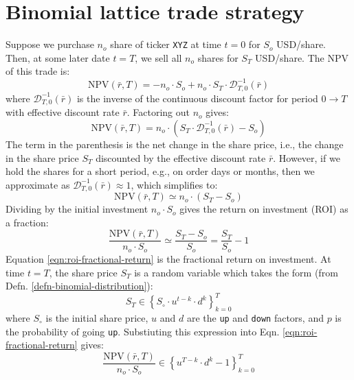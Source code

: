 \documentclass[11pt]{article}
\makeatletter
\theoremstyle{definition}
\renewcommand\subsubsection{\@startsection
	{subsubsection}{2}{0mm}
	{-0.05in}
	{-0.5\baselineskip}
	{\normalfont\normalsize\itshape\bfseries}}
\makeatother
\begin{document}

\section*{Binomial lattice trade strategy}
Suppose we purchase $n_{o}$ share of ticker \texttt{XYZ} at time $t=0$ for $S_{o}$ USD/share.
Then, at some later date $t=T$, we sell all $n_{o}$ shares for $S_{T}$ USD/share. 
The NPV of this trade is:
\begin{equation*}
\text{NPV}(\bar{r},T) = -n_{o}\cdot{S_{o}} + n_{o}\cdot{S_{T}}\cdot\mathcal{D}_{T,0}^{-1}(\bar{r})
\end{equation*}
where $\mathcal{D}_{T,0}^{-1}(\bar{r})$ is the inverse of the continuous discount factor 
for period $0\rightarrow{T}$ with effective discount rate $\bar{r}$. 
Factoring out $n_{o}$ gives:
\begin{equation*}
\text{NPV}(\bar{r},T) = n_{o}\cdot\left(S_{T}\cdot\mathcal{D}_{T,0}^{-1}(\bar{r}) - S_{o}\right)
\end{equation*}
The term in the parenthesis is the net change in the share price, i.e., the change in the share price $S_{T}$ discounted by the effective discount rate $\bar{r}$.
However, if we hold the shares for a short period, e.g., on order days or months, then we approximate as $\mathcal{D}_{T,0}^{-1}(\bar{r})\approx{1}$, which
simplifies to:
\begin{equation*}
\text{NPV}(\bar{r}, T) \simeq n_{o}\cdot(S_{T}-S_{o})
\end{equation*}
Dividing by the initial investment $n_{o}\cdot{S_{o}}$ gives the return on investment (ROI) as a fraction:
\begin{equation}\label{eqn:roi-fractional-return}
\frac{\text{NPV}(\bar{r}, T)}{n_{o}\cdot{S_{o}}} \simeq \frac{S_{T}-S_{o}}{S_{o}} = \frac{S_{T}}{S_{o}} - 1
\end{equation}
Equation \eqref{eqn:roi-fractional-return} is the fractional return on investment. 
At time $t=T$, the share price $S_{T}$ is a random variable which takes the form (from Defn. \ref{defn-binomial-distribution}):
\begin{equation*}
S_{T} \in \left\{S_{\circ}\cdot{u}^{t-k}\cdot{d}^{k}\right\}_{k=0}^{T}
\end{equation*}
where $S_{\circ}$ is the initial share price, $u$ and $d$ are the \texttt{up} and \texttt{down} factors, and $p$ is the probability of going \texttt{up}.
Substiuting this expression into Eqn. \eqref{eqn:roi-fractional-return} gives:
\begin{equation}
	\frac{\text{NPV}(\bar{r}, T)}{n_{o}\cdot{S_{o}}} \in \left\{u^{T-k}\cdot{d}^{k} - 1\right\}_{k=0}^{T}
\end{equation}


\clearpage
\printindex
\end{document}
